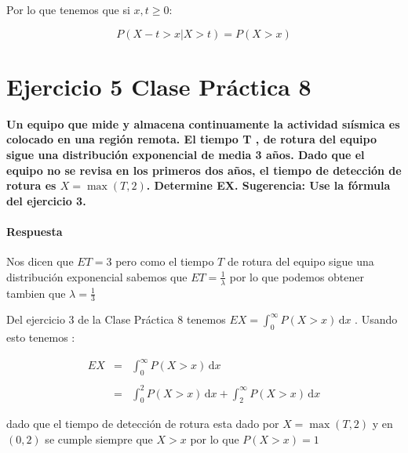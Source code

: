 \documentclass{article}
\begin{document}
\begin{flushleft}
        Por lo que tenemos que si $ x,t \ge 0 $: 

        \begin{equation*}
            P \left(X-t > x \vert  X > t\right) = P \left( X > x \right) 
        \end{equation*}

        
            
    \end{flushleft}




    \section*{Ejercicio 5 Clase Pr\'actica 8} 

    \begin{flushleft}
        {\bf Un equipo que mide y almacena continuamente la actividad sı\'ismica es colocado
        en una regi\'on remota. El tiempo T , de rotura del equipo sigue una distribuci\'on
        exponencial de media 3 años. Dado que el equipo no se revisa en los primeros
        dos años, el tiempo de detección de rotura es $X = \max (T, 2)$. Determine EX.
        Sugerencia: Use la f\'ormula del ejercicio 3. }

        \paragraph{Respuesta}
        Nos dicen que $ET = 3$ pero como el tiempo $T$ de rotura del equipo sigue una
        distribuci\'on exponencial sabemos que $ET = \frac{1}{\lambda}$  por lo que podemos 
        obtener tambien que $\lambda = \frac{1}{3}$
        
        Del ejercicio 3 de la Clase Pr\'actica 8 tenemos $EX = \int_{0}^{\infty} P\left(X > x\right) \,\mathrm{d}x $ . Usando esto tenemos : 

        \begin{equation*}
            \begin{array}{rcl}
                EX  & = &   \int_{0}^{\infty} P \left(X > x \right) \,\mathrm{d}x 
                \\\\
                    & = &  \int_{0}^{2} P \left(X > x \right) \,\mathrm{d}x + \int_{2}^{\infty} P \left(X >x \right) \,\mathrm{d}x   
            \end{array}
        \end{equation*}

        dado que el tiempo de detecci\'on de rotura esta dado por $X = \max\left(T,2\right)$ y en $\left(0,2\right)$ se cumple siempre que $X>x$
        por lo que $P\left(X>x\right) = 1 $ 


\end{flushleft}
\end{document}
